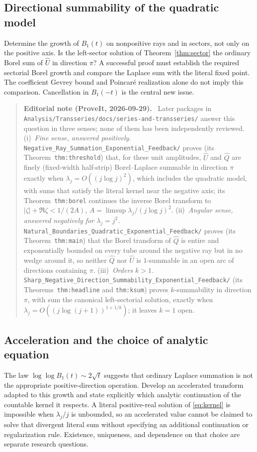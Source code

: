 \documentclass[11pt,a4paper]{article}
\numberwithin{equation}{section}
\theoremstyle{definition}
\theoremstyle{remark}
\newcommand{\Uhat}{\widehat U}
\newcommand{\Qhat}{\widehat Q}
\newenvironment{ednote}{\par\smallskip\begin{quote}\small\raggedright\textbf{Editorial note (ProveIt, 2026-09-29).}\ }{\end{quote}\smallskip}
\begin{document}
\subsection{Directional summability of the quadratic model}
Determine the growth of $B_1(t)$ on nonpositive rays and in sectors, not
only on the positive axis.  Is the left-sector solution of
Theorem~\ref{thm:sector} the ordinary Borel sum of $\Uhat$ in direction
$\pi$?  A successful proof must establish the required sectorial Borel
growth and compare the Laplace sum with the literal fixed point.
The coefficient Gevrey bound and Poincar\'e realization alone do not imply
this comparison.  Cancellation in $B_1(-t)$ is the central new issue.
\begin{ednote}
Later packages in \nolinkurl{Analysis/Transseries/docs/series-and-transseries/}
answer this question in three senses; none of them has been independently
reviewed. (i)~\emph{Fine sense, answered positively.}
\nolinkurl{Negative_Ray_Summation_Exponential_Feedback/} proves
(its Theorem~\texttt{thm:threshold}) that, for these unit amplitudes, $\Uhat$ and
$\Qhat$ are finely (fixed-width half-strip) Borel--Laplace summable in
direction $\pi$ exactly when $\lambda_j=O((j\log j)^2)$, which includes the
quadratic model, with sums that satisfy the literal kernel near the
negative axis; its Theorem~\texttt{thm:borel} continues the inverse Borel transform
to $|\zeta|+\Re\zeta<1/(2A)$, $A=\limsup\lambda_j/(j\log j)^2$.
(ii)~\emph{Angular sense, answered negatively for $\lambda_j=j^2$.}
\nolinkurl{Natural_Boundaries_Quadratic_Exponential_Feedback/} proves
(its Theorem~\texttt{thm:main}) that the Borel transform of $\Qhat$ is entire and
exponentially bounded on every tube around the negative ray but in no
wedge around it, so neither $\Qhat$ nor $\Uhat$ is $1$-summable in an open
arc of directions containing $\pi$. (iii)~\emph{Orders $k>1$.}
\nolinkurl{Sharp_Negative_Direction_Summability_Exponential_Feedback/}
(its Theorems~\texttt{thm:headline} and \texttt{thm:ksum}) proves $k$-summability in
direction $\pi$, with sum the canonical left-sectorial solution, exactly
when $\lambda_j=O((j\log(j+1))^{1+1/k})$; it leaves $k=1$ open.
\end{ednote}

\subsection{Acceleration and the choice of analytic equation}
The law $\log\log B_1(t)\sim2\sqrt t$ suggests that ordinary Laplace
summation is not the appropriate positive-direction operation.  Develop an
accelerated transform adapted to this growth and state explicitly which
analytic continuation of the countable kernel it respects.  A literal
positive-real solution of \eqref{eq:kernel} is impossible when
$\lambda_j/j$ is unbounded, so an accelerated value cannot be claimed to
solve that divergent literal sum without specifying an additional
continuation or regularization rule.  Existence, uniqueness, and dependence
on that choice are separate research questions.
\end{document}

